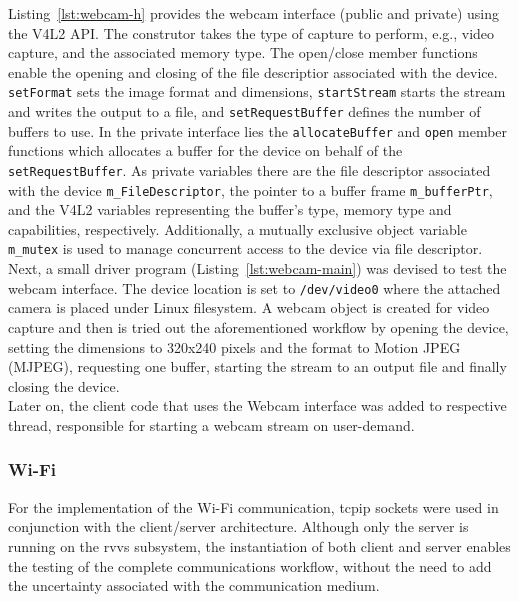 Listing~\ref{lst:webcam-h} provides the webcam interface (public and private)
using the V4L2 API. The construtor takes the type of capture to perform, e.g.,
video capture, and the associated memory type. The open/close member functions
enable the opening and closing of the file descriptior associated with the
device. \texttt{setFormat} sets the image format and dimensions,
\texttt{startStream} starts the stream and writes the output to a file, and
\texttt{setRequestBuffer} defines the number of buffers to use. In the private
interface lies the \texttt{allocateBuffer} and \texttt{open} member functions which allocates a
buffer for the device on behalf of the \texttt{setRequestBuffer}. As private
variables there are the file descriptor associated with the device
\texttt{m\_FileDescriptor}, the pointer to a buffer frame \texttt{m\_bufferPtr},
and the V4L2 variables representing the buffer's type, memory type and
capabilities, respectively. Additionally, a mutually exclusive object variable
\texttt{m\_mutex} is used to manage concurrent access to the device via file descriptor.\\
%

Next, a small driver program (Listing~\ref{lst:webcam-main}) was devised to test
the webcam interface. The device location is set to \texttt{/dev/video0} where
the attached camera is placed under Linux filesystem. A webcam object is created
for video capture and then is tried out the aforementioned workflow by opening
the device, setting the dimensions to 320x240 pixels and the format to Motion
JPEG (MJPEG), requesting one buffer, starting the stream to an output file and
finally closing the device.\\ 
%

Later on, the client code that uses the Webcam interface was added to
respective thread, responsible for starting a webcam stream on user-demand.
%
\subsubsection{Wi-Fi}%
\label{sec:wi-fi-rvvs-implem}
For the implementation of the Wi-Fi communication, \gls{tcpip} sockets were used
in conjunction with the client/server architecture. Although only the server is
running on the \gls{rvvs} subsystem, the instantiation of both client and server
enables the testing of the complete communications workflow, without the need to
add the uncertainty associated with the communication medium.

